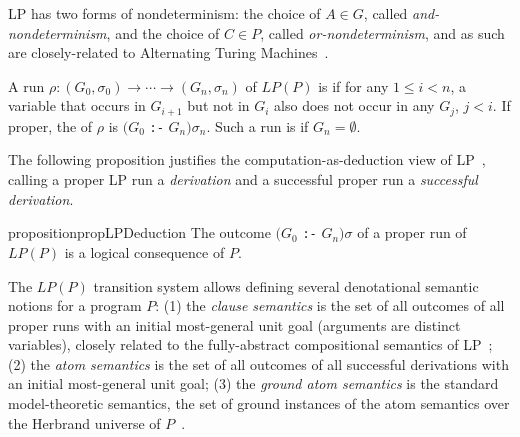 LP has two forms of nondeterminism: the choice of $A \in G$, called \emph{and-nondeterminism}, and the choice of $C \in P$, called \emph{or-nondeterminism}, and as such are closely-related to Alternating Turing Machines~\cite{shapiro1984alternation}.

\begin{definition}
\label{def:proper-run}
A run $\rho: (G_0,\sigma_0) \rightarrow \cdots \rightarrow (G_n, \sigma_n)$ of $LP(P)$ is  if for any $1\le i< n$, a variable that occurs in $G_{i+1}$ but not in $G_i$ also does not occur in any $G_j$, $j<i$. If proper, the  of $\rho$ is $(G_0$ \verb|:-| $G_n)\sigma_n$. Such a run is  if $G_n=\emptyset$.
\end{definition}
The following proposition justifies the computation-as-deduction view of LP~\cite{kowalski1974predicate},
calling a proper LP run a \emph{derivation} and a successful proper run a \emph{successful derivation}.

\begin{restatable}{proposition}{propLPDeduction}
\label{prop:lp-deduction}
The outcome $(G_0$ \texttt{:-} $G_n)\sigma$ of a proper run of $LP(P)$ is a logical consequence of $P$.
\end{restatable}

The $LP(P)$ transition system allows defining several denotational semantic notions for a program $P$: (1) the \emph{clause semantics} is the set of all outcomes of all proper runs with an initial most-general unit goal (arguments are distinct variables), closely related to the fully-abstract compositional semantics of LP~\cite{gaifman1989fully}; (2) the \emph{atom semantics} is the set of all outcomes of all successful derivations with an initial most-general unit goal; (3) the \emph{ground atom semantics} is the standard model-theoretic semantics, the set of ground instances of the atom semantics over the Herbrand universe of $P$~\cite{lloyd1987foundations}.
